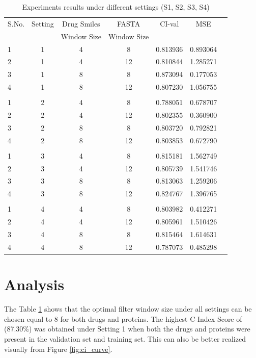 \begin{table}[H]
    \centering
    \caption{Experiments results under different settings (S1, S2, S3, S4)}
    \begin{tabular}{|l|c|c|c|c|c|c|}
    \hline 
    
     S.No. & Setting & Drug Smiles & FASTA &  CI-val & MSE  \\ 
       &   & Window Size &  Window Size    & &    \\  \toprule \hline
     1 & 1 & 4 & 8 & 0.813936 & 0.893064 \\ \hline
     2 & 1 & 4 & 12 & 0.810844 & 1.285271 \\ \hline
     3 & 1 & 8 & 8 & 0.873094 & 0.177053 \\ \hline
     4 & 1 & 8 & 12 & 0.807230 & 1.056755 \\ \hline
     \\ \hline
     1 & 2 & 4 & 8 & 0.788051 & 0.678707 \\ \hline
     2 & 2 & 4 & 12 & 0.802355 & 0.360900 \\ \hline
     3 & 2 & 8 & 8 & 0.803720 & 0.792821 \\ \hline
     4 & 2 & 8 & 12 & 0.803853 & 0.672790 \\ \hline
     \\ \hline
     1 & 3 & 4 & 8 & 0.815181 & 1.562749 \\ \hline
     2 & 3 & 4 & 12 & 0.805739 & 1.541746 \\ \hline
     3 & 3 & 8 & 8 & 0.813063 & 1.259206 \\ \hline
     4 & 3 & 8 & 12 & 0.824767 & 1.396765 \\ \hline
     \\ \hline
     1 & 4 & 4 & 8 & 0.803982 & 0.412271 \\ \hline
     2 & 4 & 4 & 12 & 0.805961 & 1.510426 \\ \hline
     3 & 4 & 8 & 8 & 0.815464 & 1.614631 \\ \hline
     4 & 4 & 8 & 12 & 0.787073 & 0.485298 \\ \hline
     
    
    
    \end{tabular}
    \label{table:results}
\end{table}

\section{Analysis}
The Table \ref{table:results} shows that the optimal filter window size under all settings can be chosen equal to 8 for both drugs and proteins. The highest C-Index Score of (87.30\%) was obtained under Setting 1 when both the drugs and proteins were present in the validation set and training set. This can also be better realized visually from Figure \ref{fig:ci_curve}.
 
